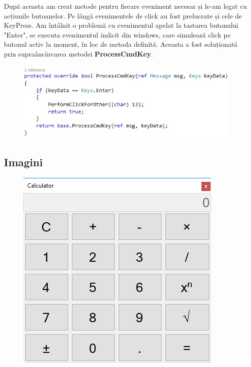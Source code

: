 \par După aceasta am creat metode pentru fiecare eveniment necesar și le-am legat cu acțiunile butoanelor. Pe lângă evenimentele de click au fost prelucrate și cele de KeyPress. Am întâlnit o problemă cu evenimentul apelat la tastarea butonului "Enter", se executa evenimentul imlicit din windows, care simulează click pe butonul activ la moment, în loc de metoda definită. Aceasta a fost soluționată prin supraâncărcarea metodei \textbf{ProcessCmdKey}.

\begin{figure}[ht]
 \includegraphics[scale=1]{imagini/override}
 \centering
\end{figure}

\subsection{Imagini}

\begin{figure}[ht]
 \includegraphics[scale=1]{imagini/1-initial}
 \centering
\end{figure}

